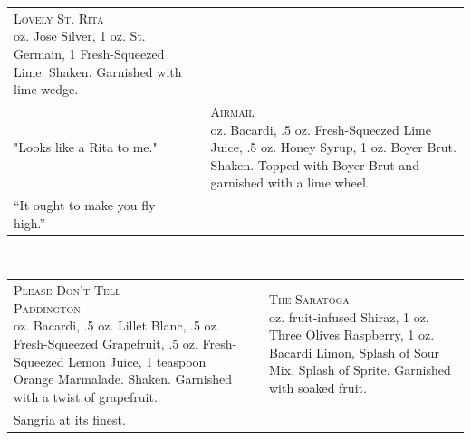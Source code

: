 \documentclass{article}
\makeatletter
\newcommand \Dotfill {\leavevmode \cleaders \hb@xt@ .25em{\hss .\hss }\hfill \kern \z@}%
\makeatother
\begin{document}
{\begin{tabular}{m{}m{}m{}}
{\centering\Huge\textsc{Lovely St. Rita}\\*}
\centering 2 oz. Jose Silver, 1 oz. St. Germain, 1 Fresh-Squeezed Lime. Shaken.  Garnished with lime wedge.\\
\centering\small{"Looks like a Rita to me."}
&
&
{\centering\Huge\textsc{Airmail}\\*}
\centering 2 oz. Bacardi, .5 oz. Fresh-Squeezed Lime Juice, .5 oz. Honey Syrup, 1 oz. Boyer Brut. Shaken. Topped with Boyer Brut and garnished with a lime wheel.\\
\centering\small{“It ought to make you fly high.”}
\end{tabular}
\\\makebox[\columnwidth]{\Huge\Dotfill}

\begin{tabular}{m{}m{}m{}}
{\centering\Huge\textsc{Please Don't Tell\\[-10pt] Paddington}\\*}
\centering 1.5 oz. Bacardi, .5 oz. Lillet Blanc, .5 oz. Fresh-Squeezed Grapefruit, .5 oz. Fresh-Squeezed Lemon Juice, 1 teaspoon Orange Marmalade. Shaken. Garnished with a twist of grapefruit.
&
&
{\centering\Huge\textsc{The Saratoga}\\*}
\centering 3 oz. fruit-infused Shiraz, 1 oz. Three Olives Raspberry, 1 oz. Bacardi Limon, Splash of Sour Mix, Splash of Sprite. Garnished with soaked fruit.\\
\centering\small{Sangria at its finest.}
\end{tabular}
\\\makebox[\columnwidth]{\Huge\Dotfill}


}
\end{document}
